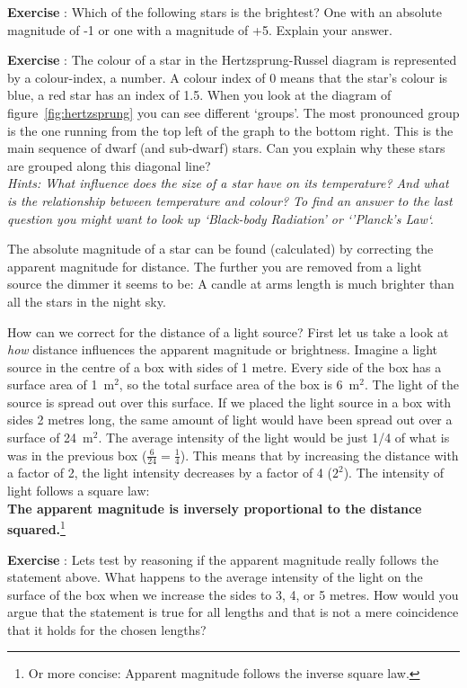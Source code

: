 \documentclass[12pt,a4paper]{article}
\numberwithin{equation}{section}
\numberwithin{figure}{section}
\newcounter{Exercise}
\numberwithin{table}{section}
\begin{document}
\begin{shaded}
\textbf{Exercise \theExercise {}} : Which of the following stars is the brightest? One with an absolute magnitude of -1 or one with a magnitude of +5. Explain your answer.\end{shaded}
\begin{shaded}
\textbf{Exercise \theExercise {}} : The colour of a star in the Hertzsprung-Russel diagram is represented by a colour-index, a number. A colour index of 0 means that the star's colour is blue, a red star has an index of 1.5. When you look at the diagram of figure~\ref{fig:hertzsprung} you can see different `groups'. The most pronounced group is the one running from the top left of the graph to the bottom right. This is the main sequence of dwarf (and sub-dwarf) stars. Can you explain why these stars are grouped along this diagonal line?\\ \textit{Hints: What influence does the size of a star have on its temperature? And what is the relationship between temperature and colour? To find an answer to the last question you might want to look up `Black-body Radiation' or `'Planck's Law`.}\end{shaded}

The absolute magnitude of a star can be found (calculated) by correcting the apparent magnitude for distance. The further you are removed from a light source the dimmer it seems to be: A candle at arms length is much brighter than all the stars in the night sky.

How can we correct for the distance of a light source? First let us take a look at \emph{how} distance influences the apparent magnitude or brightness. Imagine a light source in the centre of a box with sides of 1 metre. Every side of the box has a surface area of 1~m$^2$, so the total surface area of the box is 6~m$^2$. The light of the source is spread out over this surface. If we placed the light source in a box with sides 2 metres long, the same amount of light would have been spread out over a surface of 24~m$^2$. The average intensity of the light would be just 1/4 of what is was in the previous box ($\frac{6}{24}=\frac{1}{4}$). This means that by increasing the distance with a factor of 2, the light intensity decreases by a factor of 4 ($2^2$). The intensity of light follows a square law: \\
\indent \textbf{The apparent magnitude is inversely proportional to the distance squared.}\footnote{Or more concise: Apparent magnitude follows the inverse square law.}

\begin{shaded}
\textbf{Exercise \theExercise {}} : Lets test by reasoning if the apparent magnitude really follows the statement above. What happens to the average intensity of the light on the surface of the box when we increase the sides to 3, 4, or 5 metres. How would you argue that the statement is true for all lengths and that is not a mere coincidence that it holds for the chosen lengths?\end{shaded}
\end{document}
